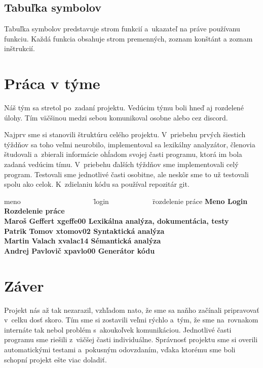 \documentclass[a4paper, 11pt]{article}
\begin{document}
    
    
    \subsection{Tabuľka symbolov}
    
    Tabuľka symbolov predstavuje strom funkcií a~ukazateľ na práve používanu funkciu. Každá funkcia obsahuje strom premenných, zoznam konštánt a zoznam inštrukcií.
    
    \section{Práca v týme}
    
    Náš tým sa stretol po~zadaní projektu. Vedúcim týmu boli hneď aj rozdelené úlohy. Tím väčšinou medzi sebou komunikoval osobne alebo cez discord. 
    
    Najprv sme si stanovili štruktúru celého projektu. V~priebehu prvých šiestich týždňov sa toho veľmi neurobilo, implementoval sa lexikálny analyzátor, členovia študovali a~zbierali informácie ohĺadom svojej časti programu, ktorá im bola zadaná vedúcim tímu. V~priebehu ďalších týždňov sme implementovali celý program. Testovali sme jednotlivé časti osobitne, ale neskôr sme to už testovali spolu ako celok. K~zdielaniu kódu sa používal repozitár git.
    
    \begin{tabbing}
    meno ~~~~~~~~~~~~~~~~~~~~\= login ~~~~~~~~~~~
    \= rozdelenie práce \kill
    \bfseries Meno \>
    \bfseries Login \>
    \bfseries Rozdelenie práce \\[2mm]
    Maroš Geffert \> xgeffe00 \> Lexikálna analýza, dokumentácia, testy \\
    Patrik Tomov \> xtomov02 \> Syntaktická analýza\\
    Martin Valach \> xvalac14 \> Sémantická analýza \\
    Andrej Pavlovič \> xpavlo00 \> Generátor kódu
    \end{tabbing}


    \section{Záver}
    
    Projekt nás až tak nezarazil, vzhľadom nato, že sme sa naňho začínali pripravovať v~celku dosť skoro. Tím sme si zostavili veľmi rýchlo a~tým, že sme na~rovnakom internáte tak nebol problém s~akoukoľvek komunikáciou. Jednotlivé časti programu sme riešili z~väčšej časti individuálne.
    Správnosť projektu sme si overili automatickými testami a~pokusným odovzdaním, vďaka ktorému sme boli schopní projekt ešte viac doladiť.
    
\end{document}

